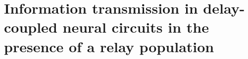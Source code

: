 \documentclass[../main.tex]{subfiles}
\begin{document}
\chapter[Information transmission in delay-coupled neural circuits]{Information transmission in delay-coupled neural circuits in the presence of a relay population}




\end{document}
